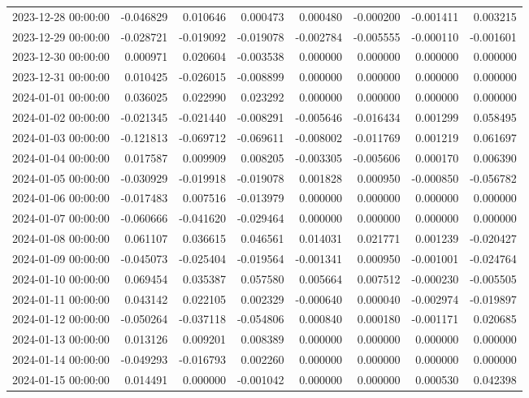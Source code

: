 \begin{tabular}{lrrrrrrr}
2023-12-28 00:00:00 & -0.046829 & 0.010646 & 0.000473 & 0.000480 & -0.000200 & -0.001411 & 0.003215 \\
2023-12-29 00:00:00 & -0.028721 & -0.019092 & -0.019078 & -0.002784 & -0.005555 & -0.000110 & -0.001601 \\
2023-12-30 00:00:00 & 0.000971 & 0.020604 & -0.003538 & 0.000000 & 0.000000 & 0.000000 & 0.000000 \\
2023-12-31 00:00:00 & 0.010425 & -0.026015 & -0.008899 & 0.000000 & 0.000000 & 0.000000 & 0.000000 \\
2024-01-01 00:00:00 & 0.036025 & 0.022990 & 0.023292 & 0.000000 & 0.000000 & 0.000000 & 0.000000 \\
2024-01-02 00:00:00 & -0.021345 & -0.021440 & -0.008291 & -0.005646 & -0.016434 & 0.001299 & 0.058495 \\
2024-01-03 00:00:00 & -0.121813 & -0.069712 & -0.069611 & -0.008002 & -0.011769 & 0.001219 & 0.061697 \\
2024-01-04 00:00:00 & 0.017587 & 0.009909 & 0.008205 & -0.003305 & -0.005606 & 0.000170 & 0.006390 \\
2024-01-05 00:00:00 & -0.030929 & -0.019918 & -0.019078 & 0.001828 & 0.000950 & -0.000850 & -0.056782 \\
2024-01-06 00:00:00 & -0.017483 & 0.007516 & -0.013979 & 0.000000 & 0.000000 & 0.000000 & 0.000000 \\
2024-01-07 00:00:00 & -0.060666 & -0.041620 & -0.029464 & 0.000000 & 0.000000 & 0.000000 & 0.000000 \\
2024-01-08 00:00:00 & 0.061107 & 0.036615 & 0.046561 & 0.014031 & 0.021771 & 0.001239 & -0.020427 \\
2024-01-09 00:00:00 & -0.045073 & -0.025404 & -0.019564 & -0.001341 & 0.000950 & -0.001001 & -0.024764 \\
2024-01-10 00:00:00 & 0.069454 & 0.035387 & 0.057580 & 0.005664 & 0.007512 & -0.000230 & -0.005505 \\
2024-01-11 00:00:00 & 0.043142 & 0.022105 & 0.002329 & -0.000640 & 0.000040 & -0.002974 & -0.019897 \\
2024-01-12 00:00:00 & -0.050264 & -0.037118 & -0.054806 & 0.000840 & 0.000180 & -0.001171 & 0.020685 \\
2024-01-13 00:00:00 & 0.013126 & 0.009201 & 0.008389 & 0.000000 & 0.000000 & 0.000000 & 0.000000 \\
2024-01-14 00:00:00 & -0.049293 & -0.016793 & 0.002260 & 0.000000 & 0.000000 & 0.000000 & 0.000000 \\
2024-01-15 00:00:00 & 0.014491 & 0.000000 & -0.001042 & 0.000000 & 0.000000 & 0.000530 & 0.042398 \\

\end{tabular}
